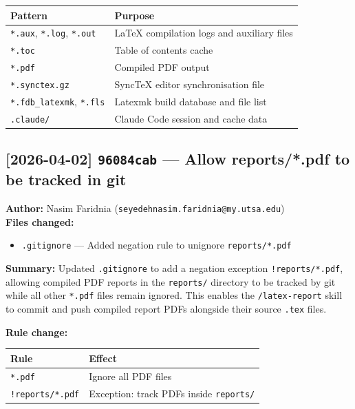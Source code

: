 \documentclass[12pt,a4paper]{article}
\begin{document}
\begin{center}
\begin{tabular}{ll}
\toprule
\textbf{Pattern} & \textbf{Purpose} \\
\midrule
\texttt{*.aux}, \texttt{*.log}, \texttt{*.out} & LaTeX compilation logs and auxiliary files \\
\texttt{*.toc} & Table of contents cache \\
\texttt{*.pdf} & Compiled PDF output \\
\texttt{*.synctex.gz} & SyncTeX editor synchronisation file \\
\texttt{*.fdb\_latexmk}, \texttt{*.fls} & Latexmk build database and file list \\
\texttt{.claude/} & Claude Code session and cache data \\
\bottomrule
\end{tabular}
\end{center}

\subsection*{[2026-04-02] \texttt{96084cab} --- Allow reports/*.pdf to be tracked in git}

\textbf{Author:} Nasim Faridnia (\texttt{seyedehnasim.faridnia@my.utsa.edu}) \\[0.3em]
\textbf{Files changed:}
\begin{itemize}
  \item \texttt{.gitignore} --- Added negation rule to unignore \texttt{reports/*.pdf}
\end{itemize}

\vspace{0.3em}
\textbf{Summary:} Updated \texttt{.gitignore} to add a negation exception \texttt{!reports/*.pdf},
allowing compiled PDF reports in the \texttt{reports/} directory to be tracked by git while
all other \texttt{*.pdf} files remain ignored. This enables the \texttt{/latex-report} skill
to commit and push compiled report PDFs alongside their source \texttt{.tex} files.

\vspace{0.5em}
\textbf{Rule change:}

\begin{center}
\begin{tabular}{ll}
\toprule
\textbf{Rule} & \textbf{Effect} \\
\midrule
\texttt{*.pdf} & Ignore all PDF files \\
\texttt{!reports/*.pdf} & Exception: track PDFs inside \texttt{reports/} \\
\bottomrule
\end{tabular}
\end{center}
\end{document}
